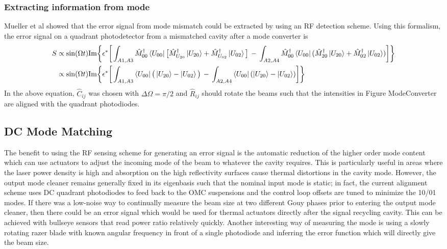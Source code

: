 \subsubsection{Extracting information from mode}
Mueller et al \cite{MuellerMM} showed that the error signal from mode mismatch could be extracted by using an RF detection scheme. Using this formalism, the error signal on a quadrant photodetector from a mismatched cavity after a mode converter is 
	\begin{equation}
	\begin{aligned}
	S 	&\propto \sin(\Omega t) \text{Im} \bigg\{ \epsilon^{*} \bigg[\int_{A1,A3} \hat{M}^{\dagger}_{00} \bra{U_{00}} \big[\hat{M}^{\dagger}_{U_{20}} \ket{U_{20}} + \hat{M}^{\dagger}_{U_{02}} \ket{U_{02}}\big]  \,-\, \int_{A2,A4} \hat{M}^{\dagger}_{00} \bra{U_{00}} (\hat{M}^{\dagger}_{20} \ket{U_{20}} + \hat{M}^{\dagger}_{02} \ket{U_{02}}) \bigg] \bigg\}\\
	&\propto \sin(\Omega t) \text{Im} \bigg\{ \epsilon^{*} \bigg[\int_{A1,A3} \bra{U_{00}} \big(\ket{U_{20}} - \ket{U_{02}}\big)  \,-\, \int_{A2,A4}  \bra{U_{00}} ( \ket{U_{20}} - \ket{U_{02}}) \bigg] \bigg\}
	\end{aligned}
	\end{equation}
In the above equation, $\hat{C}_{ij} $ was chosen with $\Delta \Omega = \pi/2$ and $\hat{R}_{ij}$ should rotate the beams such that the intensities in Figure {ModeConverter} are aligned with the quadrant photodiodes.
		
\subsection{DC Mode Matching}
	The benefit to using the RF sensing scheme for generating an error signal is the automatic reduction of the higher order mode content which can use actuators to adjust the incoming mode of the beam to whatever the cavity requires.
	This is particularly useful in areas where the laser power density is high and absorption on the high reflectivity surfaces cause thermal distortions in the cavity mode.
	However, the output mode cleaner remains generally fixed in its eigenbasis such that the nominal input mode is static; in fact, the current alignment scheme uses DC quadrant photodiodes to feed back to the OMC suspensions and the control loop offsets are tuned to minimize the 10/01 modes.
	If there was a low-noise way to continually measure the beam size at two different Gouy phases prior to entering the output mode cleaner, then there could be an error signal which would be used for thermal actuators directly after the signal recycling cavity.
	This can be achieved with bullseye sensors that read power ratio relatively quickly.
	Another interesting way of measuring the mode is using a slowly rotating razer blade with known angular frequency in front of a single photodiode and inferring the error function which will directly give the beam size.
	